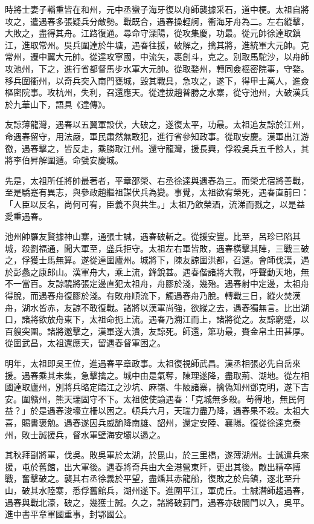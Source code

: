 \begin{pinyinscope}
時將士妻子輜重皆在和州，元中丞蠻子海牙復以舟師襲據采石，道中梗。太祖自將攻之，遣遇春多張疑兵分敵勢。戰既合，遇春操輕舸，衝海牙舟為二。左右縱擊，大敗之，盡得其舟。江路復通。尋命守溧陽，從攻集慶，功最。從元帥徐達取鎮江，進取常州。吳兵圍達於牛塘，遇春往援，破解之，擒其將，進統軍大元帥。克常州，遷中翼大元帥。從達攻寧國，中流矢，裹創斗，克之。別取馬駝沙，以舟師攻池州，下之，進行省都督馬步水軍大元帥。從取婺州，轉同僉樞密院事，守婺。移兵圍衢州，以奇兵突入南門甕城，毀其戰具，急攻之，遂下，得甲士萬人，進僉樞密院事。攻杭州，失利，召還應天。從達拔趙普勝之水寨，從守池州，大破漢兵於九華山下，語具《達傳》。

友諒薄龍灣，遇春以五翼軍設伏，大破之，遂復太平，功最。太祖追友諒於江州，命遇春留守，用法嚴，軍民肅然無敢犯，進行省參知政事。從取安慶。漢軍出江游徼，遇春擊之，皆反走，乘勝取江州。還守龍灣，援長興，俘殺吳兵五千餘人，其將李伯昇解圍遁。命甓安慶城。

先是，太祖所任將帥最著者，平章邵榮、右丞徐達與遇春為三。而榮尤宿將善戰，至是驕蹇有異志，與參政趙繼祖謀伏兵為變。事覺，太祖欲宥榮死，遇春直前曰：「人臣以反名，尚何可宥，臣義不與共生。」太祖乃飲榮酒，流涕而戮之，以是益愛重遇春。

池州帥羅友賢據神山寨，通張士誠，遇春破斬之。從援安豐。比至，呂珍已陷其城，殺劉福通，聞大軍至，盛兵拒守。太祖左右軍皆敗，遇春橫擊其陣，三戰三破之，俘獲士馬無算。遂從達圍廬州。城將下，陳友諒圍洪都，召還。會師伐漢，遇於彭蠡之康郎山。漢軍舟大，乘上流，鋒銳甚。遇春偕諸將大戰，呼聲動天地，無不一當百。友諒驍將張定邊直犯太祖舟，舟膠於淺，幾殆。遇春射中定邊，太祖舟得脫，而遇春舟復膠於淺。有敗舟順流下，觸遇春舟乃脫。轉戰三日，縱火焚漢舟，湖水皆赤，友諒不敢復戰。諸將以漢軍尚強，欲縱之去，遇春獨無言。比出湖口，諸將欲放舟東下，太祖命扼上流。遇春乃溯江而上，諸將從之。友諒窮蹙，以百艘突圍。諸將邀擊之，漢軍遂大潰，友諒死。師還，第功最，賚金帛土田甚厚。從圍武昌，太祖還應天，留遇春督軍困之。

明年，太祖即吳王位，進遇春平章政事。太祖復視師武昌。漢丞相張必先自岳來援。遇春乘其未集，急擊擒之。城中由是氣奪，陳理遂降，盡取荊、湖地。從左相國達取廬州，別將兵略定臨江之沙坑、麻嶺、牛陂諸寨，擒偽知州鄧克明，遂下吉安。圍贛州，熊天瑞固守不下。太祖使使諭遇春：「克城無多殺。茍得地，無民何益？」於是遇春浚壕立柵以困之。頓兵六月，天瑞力盡乃降，遇春果不殺。太祖大喜，賜書褒勉。遇春遂因兵威諭降南雄、韶州，還定安陸、襄陽。復從徐達克泰州，敗士誠援兵，督水軍壁海安壩以遏之。

其秋拜副將軍，伐吳。敗吳軍於太湖，於毘山，於三里橋，遂薄湖州。士誠遣兵來援，屯於舊館，出大軍後。遇春將奇兵由大全港營東阡，更出其後。敵出精卒搏戰，奮擊破之。襲其右丞徐義於平望，盡燔其赤龍船，復敗之於烏鎮，逐北至升山，破其水陸寨，悉俘舊館兵，湖州遂下。進圍平江，軍虎丘。士誠潛師趨遇春，遇春與戰北濠，破之，幾獲士誠。久之，諸將破葑門，遇春亦破閶門以入，吳平。進中書平章軍國重事，封鄂國公。


\end{pinyinscope}

